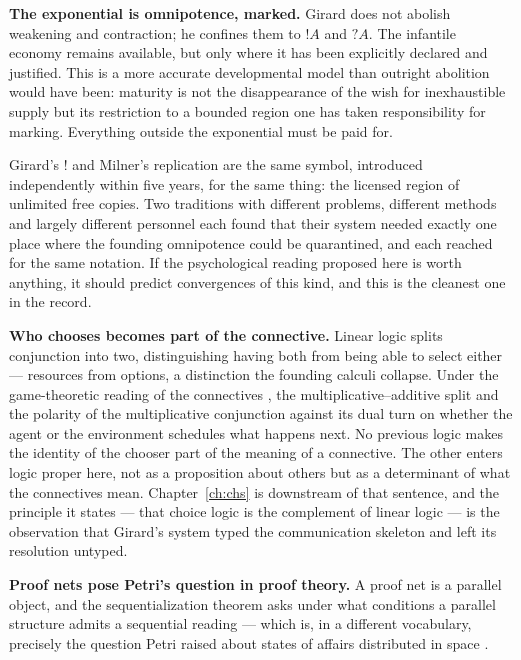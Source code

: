\textbf{The exponential is omnipotence, marked.}
Girard does not abolish weakening and contraction; he confines them
to $!A$ and $?A$.
The infantile economy remains available, but only where it has been
explicitly declared and justified.
This is a more accurate developmental model than outright abolition
would have been: maturity is not the disappearance of the wish for
inexhaustible supply but its restriction to a bounded region one has
taken responsibility for marking.
Everything outside the exponential must be paid for.

\begin{remark}
\label{psy:rem:bang}
Girard's $!$ and Milner's replication are the same symbol,
introduced independently within five years, for the same thing: the
licensed region of unlimited free copies.
Two traditions with different problems, different methods and
largely different personnel each found that their system needed
exactly one place where the founding omnipotence could be
quarantined, and each reached for the same notation.
If the psychological reading proposed here is worth anything, it
should predict convergences of this kind, and this is the cleanest
one in the record.
\end{remark}

\textbf{Who chooses becomes part of the connective.}
Linear logic splits conjunction into two, distinguishing having both
from being able to select either --- resources from options, a
distinction the founding calculi collapse.
Under the game-theoretic reading of the connectives
\cite{blass1992,abramskyPaP}, the multiplicative--additive split
and the polarity of the multiplicative conjunction against its dual
turn on whether the agent or the environment schedules what happens
next.
No previous logic makes the identity of the chooser part of the
meaning of a connective.
The other enters logic proper here, not as a proposition about
others but as a determinant of what the connectives mean.
Chapter~\ref{ch:chs} is downstream of that sentence, and the
principle it states --- that choice logic is the complement of
linear logic --- is the observation that Girard's system typed the
communication skeleton and left its resolution untyped.

\textbf{Proof nets pose Petri's question in proof theory.}
A proof net is a parallel object, and the sequentialization theorem
asks under what conditions a parallel structure admits a sequential
reading --- which is, in a different vocabulary, precisely the
question Petri raised about states of affairs distributed in space
\cite{petri1962}.

